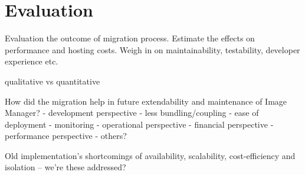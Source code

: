\chapter{Evaluation} \label{cha:evaluation}

Evaluation the outcome of migration process. Estimate the effects on performance and hosting costs. Weigh in on maintainability, testability, developer experience etc.

qualitative vs quantitative

How did the migration help in future extendability and maintenance of Image Manager?
- development perspective
  - less bundling/coupling
  - ease of deployment
  - monitoring
- operational perspective
- financial perspective
- performance perspective
- others?

Old implementation's shortcomings of availability, scalability, cost-efficiency and isolation -- we're these addressed?

